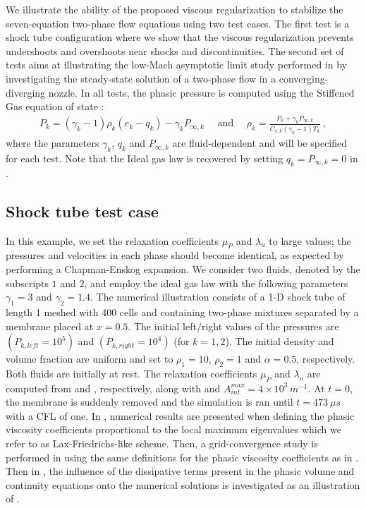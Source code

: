 We illustrate the ability of the proposed viscous regularization to stabilize the 
seven-equation two-phase flow equations using two test cases. 
The first test is a shock tube configuration where we show that the viscous regularization prevents undershoots 
and overshoots near shocks and discontinuities. The second set of tests aims at illustrating the low-Mach asymptotic limit study performed in  by investigating the steady-state solution
of a two-phase flow in a converging-diverging nozzle. In all tests, the phasic pressure is computed using the Stiffened Gas equation of state \cite{SGEOS}:
%
\begin{align}\label{eq:sgeos}
P_k = (\gamma_k-1) \rho_k( e_k -q_k) -\gamma_k P_{\infty,k} \quad \text{ and } \quad 
\rho_k = \frac{P_k+\gamma_k P_{\infty,k}}{C_{v,k} (\gamma_k-1)T_k} \ ,
\end{align}
%
where the parameters $\gamma_k$, $q_k$ and $P_{\infty,k}$ are fluid-dependent and will be specified for each test. Note that the Ideal gas law is recovered by setting 
$q_k = P_{\infty,k}=0$ in .
%
\subsection{Shock tube test case}\label{sec:first-test}
%
In this example, we set the relaxation coefficients $\mu_P$ and $\lambda_u$ to large values; the pressures and velocities in each phase should become identical, as expected by performing a Chapman-Enskog expansion.
We consider two fluids, denoted by the subscripts $1$ and $2$, and employ the ideal gas law with the following parameters $\gamma_1=3$ and $\gamma_2=1.4$. 
The numerical illustration consists of a 1-D shock tube of length 1 meshed with 400 cells and containing two-phase mixtures separated by a membrane placed at $x=0.5$. 
The initial left/right values of the pressures are
 $(P_{k,left}=10^5)$ and $(P_{k,right}=10^4)$ (for $k=1,2$). The initial density and volume fraction are uniform and set to $\rho_1=10$, $\rho_2=1$ and $\alpha = 0.5$, respectively. 
Both fluids are initially at rest. The relaxation coefficients $\mu_P$ and $\lambda_u$ are computed from  and , respectively, 
along with  and $A_{int}^{max}=4 \times 10^3\,m^{-1}$. At $t=0$, the membrane is suddenly removed and the simulation is ran until $t=473 \ \mu s$ with a CFL of one. 
In , numerical results are presented when defining the phasic viscosity coefficients proportional to the local maximum eigenvalues which we refer to as Lax-Friedrichs-like scheme. 
Then, a grid-convergence study is performed in  using the same definitions for the phasic viscosity coefficients as in . Then in , the influence of the dissipative terms present in the phasic volume and continuity equations onto the numerical solutions is investigated as an illustration of . %
%
